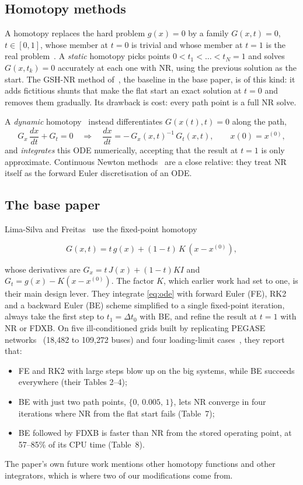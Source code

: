 \documentclass[11pt,a4paper]{article}
\newcommand{\xo}{x^{(0)}}
\begin{document}
\subsection{Homotopy methods}
A homotopy replaces the hard problem $g(x)=0$ by a family $G(x,t)=0$, $t\in[0,1]$, whose member at $t=0$
is trivial and whose member at $t=1$ is the real problem~\cite{watson1989,allgower2003}. A \emph{static}
homotopy picks points $0<t_1<\dots<t_N=1$ and solves $G(x,t_k)=0$ accurately at each one with NR, using
the previous solution as the start. The GSH-NR method of~\cite{freitas2022}, the baseline in the base
paper, is of this kind: it adds fictitious shunts that make the flat start an exact solution at $t=0$ and
removes them gradually. Its drawback is cost: every path point is a full NR solve.

A \emph{dynamic} homotopy~\cite{lima2024ijepes} instead differentiates $G(x(t),t)=0$ along the path,
\begin{equation}
  G_x\,\frac{dx}{dt} + G_t = 0
  \quad\Longrightarrow\quad
  \frac{dx}{dt} = -\,G_x(x,t)^{-1}\,G_t(x,t), \qquad x(0)=\xo, \label{eq:ode}
\end{equation}
and \emph{integrates} this ODE numerically, accepting that the result at $t=1$ is only approximate.
Continuous Newton methods~\cite{milano2009} are a close relative: they treat NR itself as the forward
Euler discretisation of an ODE.

\subsection{The base paper}\label{sec:basepaper}
Lima-Silva and Freitas~\cite{lima2024} use the fixed-point homotopy
\begin{keyeq}
\begin{equation}
  G(x,t) = t\,g(x) + (1-t)\,K\,(x-\xo), \label{eq:G}
\end{equation}
\end{keyeq}
whose derivatives are $G_x = t\,J(x)+(1-t)KI$ and $G_t = g(x)-K(x-\xo)$. The factor $K$, which earlier
work had set to one, is their main design lever. They integrate \eqref{eq:ode} with forward Euler (FE),
RK2 and a backward Euler (BE) scheme simplified to a single fixed-point iteration, always take the first
step to $t_1=\Delta t_0$ with BE, and refine the result at $t=1$ with NR or FDXB. On five ill-conditioned
grids built by replicating PEGASE networks~\cite{pegase} (18{,}482 to 109{,}272 buses) and four
loading-limit cases~\cite{tostado2019ill,tostado2019limit}, they report that:
\begin{itemize}
  \item FE and RK2 with large steps blow up on the big systems, while BE succeeds everywhere (their Tables 2--4);
  \item BE with just two path points, $\{0,\,0.005,\,1\}$, lets NR converge in four iterations where NR
        from the flat start fails (Table~7);
  \item BE followed by FDXB is faster than NR from the stored operating point, at 57--85\% of its CPU time (Table~8).
\end{itemize}
The paper's own future work mentions other homotopy functions and other integrators, which is where two
of our modifications come from.
\end{document}
